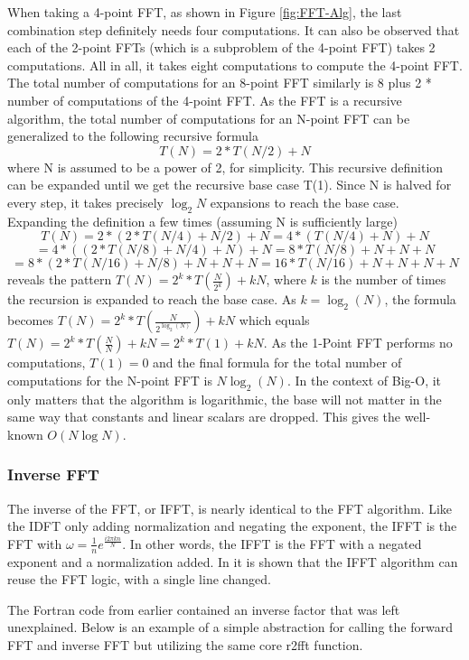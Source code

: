 When taking a 4-point FFT, as shown in Figure \ref{fig:FFT-Alg}, the last combination step definitely needs four computations. It can also be observed that each of the 2-point FFTs (which is a subproblem of the 4-point FFT) takes 2 computations. All in all, it takes eight computations to compute the 4-point FFT. The total number of computations for an 8-point FFT similarly is 8 plus 2 * number of computations of the 4-point FFT. As the FFT is a recursive algorithm, the total number of computations for an N-point FFT can be generalized to the following recursive formula
$$T(N) = 2*T(N/2) + N$$
where N is assumed to be a power of 2, for simplicity. This recursive definition can be expanded
until we get the recursive base case T(1). Since N is halved for every step, it takes precisely $\log_2 N$ expansions to reach the base case. Expanding the definition a few times (assuming N is sufficiently large)
$$T(N) = 2*(2*T(N/4) + N/2) + N = 4*(T(N/4) + N) + N$$
$$= 4*((2*T(N/8)+N/4) + N) + N = 8*T(N/8) + N + N + N$$
$$= 8*(2*T(N/16) + N/8) + N + N + N = 16*T(N/16) + N + N + N + N$$
reveals the pattern $T(N) = 2^k*T(\frac{N}{2^k}) + kN$, where $k$ is the number of times the recursion is expanded to reach the base case. As $k =\log_2(N)$, the formula becomes $T(N) = 2^k*T(\frac{N}{2^{\log_2(N)}}) + kN$ which equals $T(N) = 2^k*T(\frac{N}{N}) + kN = 2^k * T(1) + kN$. As the 1-Point FFT performs no computations, $T(1) = 0$ and the final formula for the total number of computations for the N-point FFT is $N \log_2(N)$. In the context of Big-O, it only matters that the algorithm is logarithmic, the base will not matter in the same way that constants and linear scalars are dropped. This gives the well-known $O(N\log N)$.

\subsubsection{Inverse FFT}
The inverse of the FFT, or IFFT, is nearly identical to the FFT algorithm. Like the IDFT only adding normalization and negating the exponent, the IFFT is the FFT  with $\omega = \frac{1}{n}e^{\frac{i2\pi kn}{N}}$. In other words, the IFFT is the FFT with a negated exponent and a normalization added. In \cite{Reducible2020} it is shown that the IFFT algorithm can reuse the FFT logic, with a single line changed. 

The Fortran code from earlier contained an inverse factor that was left unexplained. Below is an example of a simple abstraction for calling the forward FFT and inverse FFT but utilizing the same core r2fft function.

